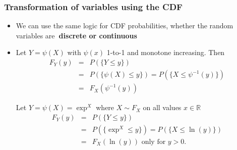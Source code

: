 \documentclass[notes=show,smaller,handout]{beamer}\usepackage[]{graphicx}\usepackage[]{color}
\renewcommand{\Pr}{P}
\newenvironment{stepitemize}{\begin{itemize}[<+->]}{\end{itemize} }
\begin{document}
\begin{frame}%

\frametitle{Transformation of variables using the CDF}

\begin{stepitemize}
\item We can use the same logic for CDF probabilities, whether the random
variables are\textbf{\ discrete or continuous}

\item Let $Y=\psi \left( X\right) $ with $\psi \left( x\right) $ 1-to-1 and
monotone increasing. Then
\begin{eqnarray*}
F_{Y}\left( y\right) &=&\Pr \left( \{ Y\leq y \}\right) \\
&=&\Pr \left( \{ \psi \left( X\right) \leq y \} \right) =\Pr \left( \{ X\leq \psi
^{-1}\left( y\right) \} \right) \\
&=&F_{X}\left( \psi ^{-1}\left( y\right) \right)
\end{eqnarray*}

\begin{example}
Let $Y=\psi \left( X\right) =\exp^{ X} $ where $%
X\sim F_X$ on all values $x\in
\mathbb{R}
$%
\begin{eqnarray*}
F_{Y}\left( y\right) &=&\Pr \left( \{ Y\leq y \} \right) \\
&=&\Pr \left( \{ \exp^{  X} \leq y \} \right) =\Pr \left( \{ X\leq \ln
\left( y\right) \} \right) \\
&=&F_{X}\left( \ln \left( y\right) \right) \text{ only for }y>0\text{.}
\end{eqnarray*}
\end{example}

\end{stepitemize}

\end{frame}%
\end{document}
